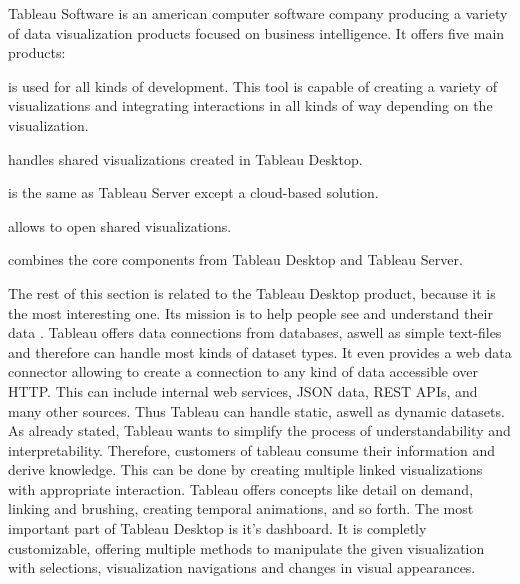 Tableau Software is an american computer software company producing a variety of data visualization products focused on business intelligence. It offers five main products:
\begin{enumerate}
 is used for all kinds of development. This tool is capable of creating a variety of visualizations and integrating interactions in all kinds of way depending on the visualization.

 handles shared visualizations created in Tableau Desktop.

 is the same as Tableau Server except a cloud-based solution.

 allows to open shared visualizations.

 combines the core components from Tableau Desktop and Tableau Server.

\end{enumerate}

The rest of this section is related to the Tableau Desktop product, because it is the most interesting one. Its mission is to help people see and understand their data .
Tableau offers data connections from databases, aswell as simple text-files and therefore can handle most kinds of dataset types. It even provides a web data connector allowing to create a connection to any kind of data accessible over HTTP. This can include internal web services, JSON data, REST APIs, and many other sources. Thus Tableau can handle static, aswell as dynamic datasets.
As \citeauthor{Murray2013} already stated, Tableau wants to simplify the process of understandability and interpretability. Therefore, customers of tableau consume their information and derive knowledge. This can be done by creating multiple linked visualizations with appropriate interaction. Tableau offers concepts like detail on demand, linking and brushing, creating temporal animations, and so forth.
The most important part of Tableau Desktop is it's dashboard. It is completly customizable, offering multiple methods to manipulate the given visualization with selections, visualization navigations and changes in visual appearances.

